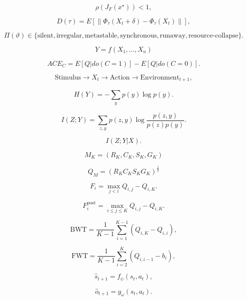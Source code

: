 \[
\rho\left( J_{F}\left( x^{\star} \right) \right) < 1,
\]

\[
D(\tau) = E\left\lbrack \parallel \Phi_{\tau}\left( X_{t} + \delta \right) - \Phi_{\tau}\left( X_{t} \right) \parallel \right\rbrack,
\]

\[
\Pi(\vartheta) \in \{\text{silent},\text{irregular},\text{metastable},\text{synchronous},\text{runaway},\text{resource-collapse}\}.
\]

\[
Y = f\left( X_{1},\ldots,X_{n} \right)
\]

\[
{ACE}_{C} = E\left\lbrack Q|do(C = 1) \right\rbrack - E\left\lbrack Q|do(C = 0) \right\rbrack.
\]

\[
\text{Stimulus} \rightarrow X_{t} \rightarrow \text{Action} \rightarrow \text{Environment}_{t + 1},
\]

\[
H(Y) = - \sum_{y}^{}p(y)\log p(y).
\]

\[
I(Z;Y) = \sum_{z,y}^{}p(z,y)\log\frac{p(z,y)}{p(z)p(y)}.
\]

\[
I\left( Z;Y|X \right).
\]

\[
M_{K} = \left( R_{K},C_{K},S_{K},G_{K} \right)
\]

\[
Q_{M} = \left( R_{K}C_{K}S_{K}G_{K} \right)^{\frac{1}{4}}
\]

\[
F_{i} = \max_{j < i}Q_{i,j} - Q_{i,K}.
\]

\[
F_i^{\mathrm{post}}=\max_{i\leq j\leq K}Q_{i,j}-Q_{i,K}.
\]

\[
\text{BWT} = \frac{1}{K - 1}\sum_{i = 1}^{K - 1}\left( Q_{i,K} - Q_{i,i} \right),
\]

\[
\text{FWT} = \frac{1}{K - 1}\sum_{i = 2}^{K}\left( Q_{i,i - 1} - b_{i} \right),
\]

\[
{\hat{s}}_{t + 1} = f_{\psi}\left( s_{t},a_{t} \right),
\]

\[
{\hat{o}}_{t + 1} = g_{\omega}\left( s_{t},a_{t} \right).
\]

